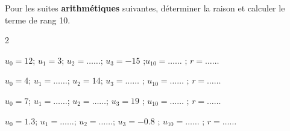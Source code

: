\documentclass[main.tex]{subfiles}
\begin{document}
\begin{exercise} \label{chapter05:exercise:suites03} 
Pour les suites \textbf{arithmétiques} suivantes, déterminer la raison et calculer le terme de rang 10. 
\vspace{-1em}
\begin{spacing}{2}
	\begin{description} 
		\item  $u_0=12$; $u_1=3$; $u_2=\ldots\ldots$; $u_3=-15$ ;\hfill $u_{10}=\ldots\ldots$  ;  \hfill  {$r=\ldots\ldots  $}  
		\item  $u_0=4$; $u_1=\ldots\ldots$; $u_2=14$; $u_3=\ldots\ldots$ ; \hfill$u_{10}=\ldots\ldots$  ;  \hfill  {$r=\ldots\ldots  $}  
		\item  $u_0=7$; $u_1=\ldots\ldots$; $u_2=\ldots\ldots$; $u_3=19$ ; \hfill$u_{10}=\ldots\ldots$  ;  \hfill  {$r=\ldots\ldots  $}   
		\item  $u_0=1.3$; $u_1=\ldots\ldots$; $u_2=\ldots\ldots$; $u_3=-0.8$ ; \hfill$u_{10}=\ldots\ldots$  ;  \hfill  {$r=\ldots\ldots  $}  
	\end{description} 
\end{spacing}\vspace{-1em}
\end{exercise}
\end{document}
